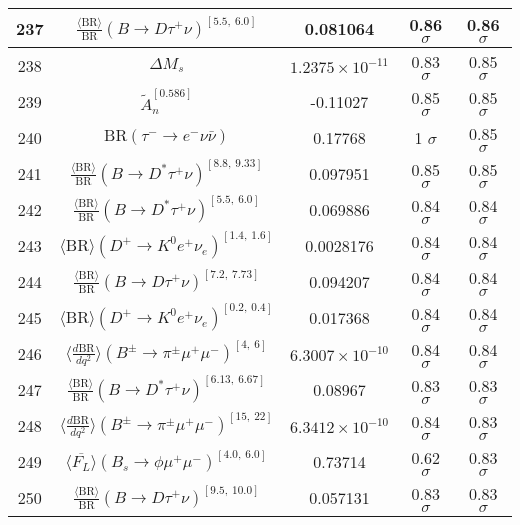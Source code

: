 \begin{longtable}{|c|c|c|c|c|}
237 &	 $\frac{\langle \mathrm{BR} \rangle}{\mathrm{BR}}(B\to D\tau^+\nu)^{[5.5,\  6.0]}$ &	 0.081064 &	 \cellcolor{green!0}0.86 $ \sigma$ &	 0.86 $ \sigma$ \\ \hline
238 &	 $\Delta M_s$ &	 $1.2375\times 10^{-11}$ &	 \cellcolor{green!1}0.83 $ \sigma$ &	 0.85 $ \sigma$ \\ \hline
239 &	 $\tilde{A}_n^{[0.586]}$ &	 -0.11027 &	 \cellcolor{green!0}0.85 $ \sigma$ &	 0.85 $ \sigma$ \\ \hline
240 &	 $\mathrm{BR}(\tau^-\to e^- \nu\bar\nu)$ &	 0.17768 &	 \cellcolor{red!8}1 $ \sigma$ &	 0.85 $ \sigma$ \\ \hline
241 &	 $\frac{\langle \mathrm{BR} \rangle}{\mathrm{BR}}(B\to D^\ast\tau^+\nu)^{[8.8,\  9.33]}$ &	 0.097951 &	 \cellcolor{green!0}0.85 $ \sigma$ &	 0.85 $ \sigma$ \\ \hline
242 &	 $\frac{\langle \mathrm{BR} \rangle}{\mathrm{BR}}(B\to D^\ast\tau^+\nu)^{[5.5,\  6.0]}$ &	 0.069886 &	 \cellcolor{green!0}0.84 $ \sigma$ &	 0.84 $ \sigma$ \\ \hline
243 &	 $\langle\mathrm{BR}\rangle(D^+\to K^0e^+\nu_e)^{[1.4,\  1.6]}$ &	 0.0028176 &	 \cellcolor{green!0}0.84 $ \sigma$ &	 0.84 $ \sigma$ \\ \hline
244 &	 $\frac{\langle \mathrm{BR} \rangle}{\mathrm{BR}}(B\to D\tau^+\nu)^{[7.2,\  7.73]}$ &	 0.094207 &	 \cellcolor{red!0}0.84 $ \sigma$ &	 0.84 $ \sigma$ \\ \hline
245 &	 $\langle\mathrm{BR}\rangle(D^+\to K^0e^+\nu_e)^{[0.2,\  0.4]}$ &	 0.017368 &	 \cellcolor{red!0}0.84 $ \sigma$ &	 0.84 $ \sigma$ \\ \hline
246 &	 $\langle \frac{d\mathrm{BR}}{dq^2} \rangle(B^\pm\to \pi^\pm \mu^+\mu^-)^{[4,\  6]}$ &	 $6.3007\times 10^{-10}$ &	 \cellcolor{red!0}0.84 $ \sigma$ &	 0.84 $ \sigma$ \\ \hline
247 &	 $\frac{\langle \mathrm{BR} \rangle}{\mathrm{BR}}(B\to D^\ast\tau^+\nu)^{[6.13,\  6.67]}$ &	 0.08967 &	 \cellcolor{green!0}0.83 $ \sigma$ &	 0.83 $ \sigma$ \\ \hline
248 &	 $\langle \frac{d\mathrm{BR}}{dq^2} \rangle(B^\pm\to \pi^\pm \mu^+\mu^-)^{[15,\  22]}$ &	 $6.3412\times 10^{-10}$ &	 \cellcolor{red!0}0.84 $ \sigma$ &	 0.83 $ \sigma$ \\ \hline
249 &	 $\langle \overline{F_L}\rangle(B_s\to \phi \mu^+\mu^-)^{[4.0,\  6.0]}$ &	 0.73714 &	 \cellcolor{green!10}0.62 $ \sigma$ &	 0.83 $ \sigma$ \\ \hline
250 &	 $\frac{\langle \mathrm{BR} \rangle}{\mathrm{BR}}(B\to D\tau^+\nu)^{[9.5,\  10.0]}$ &	 0.057131 &	 \cellcolor{green!0}0.83 $ \sigma$ &	 0.83 $ \sigma$ \\ \hline

\end{longtable}
